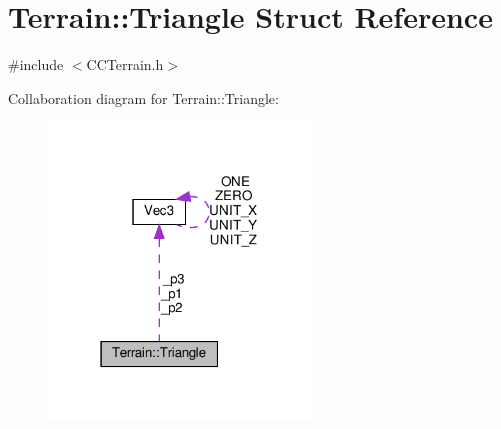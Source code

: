 \hypertarget{structTerrain_1_1Triangle}{}\section{Terrain\+:\+:Triangle Struct Reference}
\label{structTerrain_1_1Triangle}


{\ttfamily \#include $<$C\+C\+Terrain.\+h$>$}



Collaboration diagram for Terrain\+:\+:Triangle\+:
\nopagebreak
\begin{figure}[H]
\begin{center}
\leavevmode
\includegraphics[width=198pt]{structTerrain_1_1Triangle__coll__graph}
\end{center}
\end{figure}
